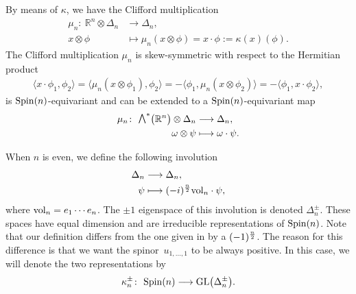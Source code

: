 \documentclass[pdftex]{sigma}
\newcommand{\ext}{\raise1pt\hbox{$\textstyle\bigwedge$}}
\newcommand{\vol}{\mbox{\rm vol}}
\numberwithin{equation}{section}
\begin{document}
By means of $\kappa$, we have the Clif\/ford multiplication
\begin{align*}
\mu_n\colon \ \mathbb{R}^n\otimes \Delta_n &\longrightarrow\Delta_n, \\
x \otimes \phi &\longmapsto \mu_n(x\otimes \phi)=x\cdot\phi :=\kappa(x)(\phi) .
\end{align*}
The Clif\/ford multiplication $\mu_n$ is skew-symmetric with respect to the Hermitian product
\begin{gather*}
\langle x\cdot\phi_1 , \phi_2\rangle =\langle \mu_n(x\otimes \phi_1) , \phi_2\rangle =-\langle \phi_1 , \mu_n(x\otimes \phi_2)\rangle =-\langle \phi_1 , x\cdot \phi_2\rangle,
\end{gather*}
is ${\rm Spin}(n)$-equivariant and can be extended to a ${\rm Spin}(n)$-equivariant map
\begin{align*}
\mu_n\colon \ \ext^*\big(\mathbb{R}^n\big)\otimes \Delta_n &\longrightarrow\Delta_n,\\
\omega \otimes \psi &\longmapsto \omega\cdot\psi.
\end{align*}

When $n$ is even, we def\/ine the following involution
\begin{align*}
\Delta_n&\longrightarrow \Delta_n, \\
\psi &\longmapsto (-i)^{n\over 2}{\rm vol}_n\cdot \psi,
\end{align*}
where $\vol_n = e_1\cdots e_n$. The $\pm 1$ eigenspace of this involution is denoted $\Delta_n^\pm$. These spaces have equal dimension and are irreducible representations of ${\rm Spin}(n)$. Note that our def\/inition dif\/fers from the one given in \cite{Friedrich} by a $(-1)^{n\over 2}$. The reason for this dif\/ference is that we want the spinor~$u_{1,\dots,1}$ to be always positive. In this case, we will denote the two representations by
\begin{gather*}
\kappa_n^\pm\colon \ {\rm Spin}(n) \longrightarrow {\rm GL}\big(\Delta_n^\pm\big).
\end{gather*}
\end{document}
